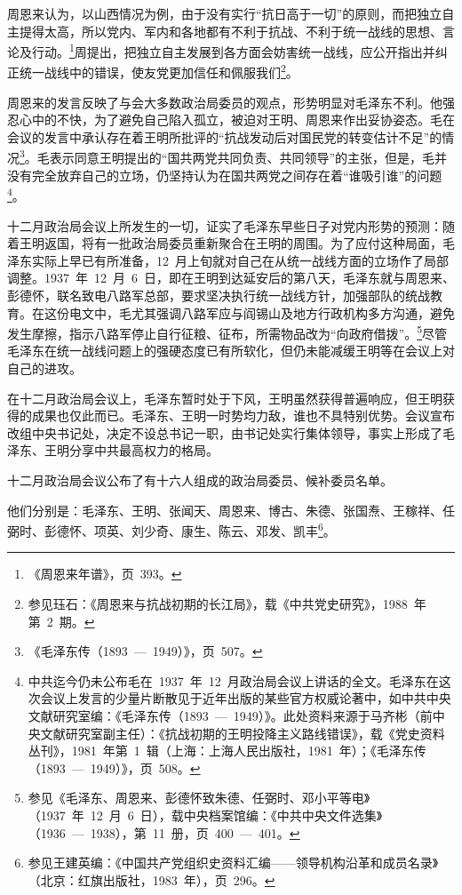 周恩来认为，以山西情况为例，由于没有实行“抗日高于一切”的原则，而把独立自主提得太高，所以党内、军内和各地都有不利于抗战、不利于统一战线的思想、言论及行动。\footnote{《周恩来年谱》，页~393。}周提出，把独立自主发展到各方面会妨害统一战线，应公开指出并纠正统一战线中的错误，使友党更加信任和佩服我们\footnote{参见珏石：《周恩来与抗战初期的长江局》，载《中共党史研究》，1988~年第~2~期。}。

周恩来的发言反映了与会大多数政治局委员的观点，形势明显对毛泽东不利。他强忍心中的不快，为了避免自己陷入孤立，被迫对王明、周恩来作出妥协姿态。毛在会议的发言中承认存在着王明所批评的“抗战发动后对国民党的转变估计不足”的情况\footnote{《毛泽东传（1893~—~1949）》，页~507。}。毛表示同意王明提出的“国共两党共同负责、共同领导”的主张，但是，毛并没有完全放弃自己的立场，仍坚持认为在国共两党之间存在着“谁吸引谁”的问题\footnote{中共迄今仍未公布毛在~1937~年~12~月政治局会议上讲话的全文。毛泽东在这次会议上发言的少量片断散见于近年出版的某些官方权威论著中，如中共中央文献研究室编：《毛泽东传（1893~—~1949）》。此处资料来源于马齐彬（前中央文献研究室副主任）：《抗战初期的王明投降主义路线错误》，载《党史资料丛刊》，1981~年第~1~辑（上海：上海人民出版社，1981~年）；《毛泽东传（1893~—~1949）》，页~508。}。

十二月政治局会议上所发生的一切，证实了毛泽东早些日子对党内形势的预测：随着王明返国，将有一批政治局委员重新聚合在王明的周围。为了应付这种局面，毛泽东实际上早已有所准备，12~月上旬就对自己在从统一战线方面的立场作了局部调整。1937~年~12~月~6~日，即在王明到达延安后的第八天，毛泽东就与周恩来、彭德怀，联名致电八路军总部，要求坚决执行统一战线方针，加强部队的统战教育。在这份电文中，毛尤其强调八路军应与阎锡山及地方行政机构多方沟通，避免发生摩擦，指示八路军停止自行征粮、征布，所需物品改为“向政府借拨”。\footnote{参见《毛泽东、周恩来、彭德怀致朱德、任弼时、邓小平等电》（1937~年~12~月~6~日），载中央档案馆编：《中共中央文件选集》（1936~—~1938），第~11~册，页~400~—~401。}尽管毛泽东在统一战线问题上的强硬态度已有所软化，但仍未能减缓王明等在会议上对自己的进攻。

在十二月政治局会议上，毛泽东暂时处于下风，王明虽然获得普遍响应，但王明获得的成果也仅此而已。毛泽东、王明一时势均力敌，谁也不具特别优势。会议宣布改组中央书记处，决定不设总书记一职，由书记处实行集体领导，事实上形成了毛泽东、王明分享中共最高权力的格局。

十二月政治局会议公布了有十六人组成的政治局委员、候补委员名单。

他们分别是：毛泽东、王明、张闻天、周恩来、博古、朱德、张国焘、王稼祥、任弼时、彭德怀、项英、刘少奇、康生、陈云、邓发、凯丰\footnote{参见王建英编：《中国共产党组织史资料汇编——领导机构沿革和成员名录》（北京：红旗出版社，1983~年），页~296。}。

